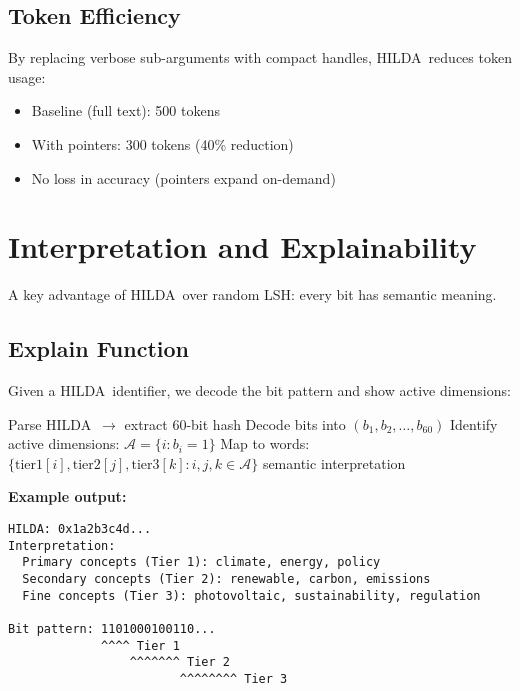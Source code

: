 \documentclass[11pt]{article}
\newcommand{\hilda}{\textsc{HILDA}}
\begin{document}
\subsection{Token Efficiency}

By replacing verbose sub-arguments with compact handles, \hilda\ reduces token usage:
\begin{itemize}
  \item Baseline (full text): 500 tokens
  \item With pointers: 300 tokens (40\% reduction)
  \item No loss in accuracy (pointers expand on-demand)
\end{itemize}

\section{Interpretation and Explainability}

A key advantage of \hilda\ over random LSH: every bit has semantic meaning.

\subsection{Explain Function}

Given a \hilda\ identifier, we decode the bit pattern and show active dimensions:

\begin{algorithm}[H]
\caption{Explain HILDA}
\begin{algorithmic}[1]
\State Parse \hilda\ $\to$ extract 60-bit hash
\State Decode bits into $(b_1, b_2, \ldots, b_{60})$
\State Identify active dimensions: $\mathcal{A} = \{i : b_i = 1\}$
\State Map to words: $\{\text{tier1}[i], \text{tier2}[j], \text{tier3}[k] : i,j,k \in \mathcal{A}\}$
\State \Return semantic interpretation
\end{algorithmic}
\end{algorithm}

\textbf{Example output:}
\begin{verbatim}
HILDA: 0x1a2b3c4d...
Interpretation:
  Primary concepts (Tier 1): climate, energy, policy
  Secondary concepts (Tier 2): renewable, carbon, emissions
  Fine concepts (Tier 3): photovoltaic, sustainability, regulation
  
Bit pattern: 1101000100110...
             ^^^^ Tier 1
                 ^^^^^^^ Tier 2
                        ^^^^^^^^ Tier 3
\end{verbatim}
\end{document}
